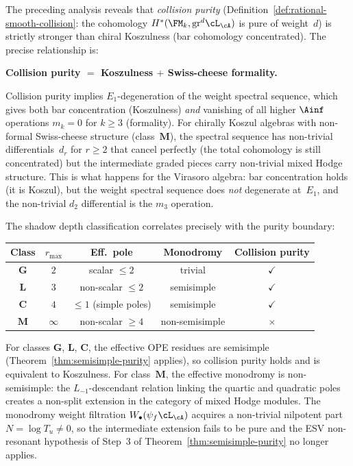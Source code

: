 \begin{remark}
\label{rem:purity-sharp-boundary}
The preceding analysis reveals that \emph{collision purity}
(Definition~\ref{def:rational-smooth-collision}: the cohomology
$H^*(\FM_k, \mathrm{gr}^d\cL_\cA)$ is pure of weight~$d$)
is strictly stronger than chiral Koszulness
(bar cohomology concentrated). The precise relationship is:

\smallskip\noindent
\textbf{Collision purity $=$ Koszulness $+$ Swiss-cheese
formality.}
\smallskip

Collision purity implies $E_1$-degeneration of the weight spectral
sequence, which gives both bar concentration (Koszulness) \emph{and}
vanishing of all higher $\Ainf$ operations $m_k = 0$ for $k \ge 3$
(formality). For chirally Koszul algebras with non-formal
Swiss-cheese structure (class~$\mathbf{M}$), the spectral
sequence has non-trivial differentials~$d_r$ for $r \ge 2$ that
cancel perfectly (the total cohomology is still concentrated)
but the intermediate graded pieces carry non-trivial mixed Hodge
structure. This is what happens for the Virasoro algebra: bar
concentration holds (it is Koszul), but the weight spectral sequence
does \emph{not} degenerate at~$E_1$, and the non-trivial $d_2$
differential is the $m_3$ operation.

\smallskip
The shadow depth classification correlates precisely with the purity
boundary:
\begin{center}
\renewcommand{\arraystretch}{1.25}
\begin{tabular}{@{}ccccc@{}}
\toprule
\textbf{Class} & $r_{\max}$ & \textbf{Eff.\ pole} &
 \textbf{Monodromy} & \textbf{Collision purity} \\
\midrule
$\mathbf{G}$ & $2$ & scalar $\leq 2$ & trivial &
 $\checkmark$ \\
$\mathbf{L}$ & $3$ & non-scalar $\leq 2$ & semisimple &
 $\checkmark$ \\
$\mathbf{C}$ & $4$ & $\leq 1$ (simple poles) & semisimple &
 $\checkmark$ \\
$\mathbf{M}$ & $\infty$ & non-scalar $\geq 4$ &
 non-semisimple & $\times$ \\
\bottomrule
\end{tabular}
\end{center}
For classes $\mathbf{G}$, $\mathbf{L}$, $\mathbf{C}$, the effective
OPE residues are semisimple (Theorem~\ref{thm:semisimple-purity}
applies), so collision purity holds and is equivalent to
Koszulness. For class~$\mathbf{M}$, the effective monodromy is
non-semisimple: the $L_{-1}$-descendant relation linking the
quartic and quadratic poles creates a non-split extension in the
category of mixed Hodge modules. The monodromy weight filtration
$W_\bullet(\psi_f \cL_\cA)$ acquires a non-trivial nilpotent part
$N = \log T_u \neq 0$, so the intermediate extension fails to be pure
and the ESV non-resonant hypothesis of Step~3 of
Theorem~\ref{thm:semisimple-purity} no longer applies.


\end{remark}
